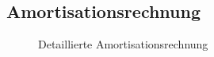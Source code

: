 \subsection{Amortisationsrechnung}
\label{app:Amortisationsrechnung}
\vspace{20mm}
\begin{figure}[htb]
\centering
{}
\caption{Detaillierte Amortisationsrechnung}
\end{figure}

